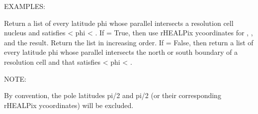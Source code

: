 \documentclass[a4paper,12ptopenany,oneside,english]{sphinxmanual}
\begin{document}
\begin{fulllineitems}
\begin{fulllineitems}
\sphinxAtStartPar
EXAMPLES:

\begin{sphinxVerbatim}[commandchars=\\\{\}]
  
   
     
   
\end{sphinxVerbatim}

\end{fulllineitems}


\begin{fulllineitems}
\label{\detokenize{dggs:rhealpixdggs.dggs.RHEALPixDGGS.cell_latitudes}}
\pysigstartsignatures
{}
\pysigstopsignatures
\sphinxAtStartPar
Return a list of every latitude phi whose parallel intersects
a resolution  cell nucleus and satisfies
 \textless{} phi \textless{} .
If  = True, then use rHEALPix y\sphinxhyphen{}coordinates for ,
, and the result. Return the list in increasing order.
If  = False, then return a list of every latitude phi whose
parallel intersects the north or south boundary of a resolution
 cell and that satisfies  \textless{} phi \textless{} .

\sphinxAtStartPar
NOTE:

\sphinxAtStartPar
By convention, the pole latitudes pi/2 and \sphinxhyphen{}pi/2 (or their
corresponding rHEALPix y\sphinxhyphen{}coordinates) will be excluded.


\end{fulllineitems}
\end{fulllineitems}
\end{document}
